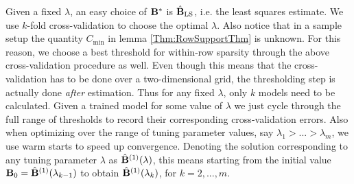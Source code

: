 Given a fixed $\lambda$, an easy choice of ${\mathbf{B}}^*$ is $\hat {{\mathbf{B}}}_\text{LS}$, i.e. the least squares estimate. We use $k$-fold cross-validation to choose the optimal $\lambda$. Also notice that in a sample setup the quantity $C_\text{min}$ in lemma \ref{Thm:RowSupportThm} is unknown. For this reason, we choose a best threshold for within-row sparsity through the above cross-validation procedure as well. Even though this means that the cross-validation has to be done over a two-dimensional grid, the thresholding step is actually done \textit{after} estimation. Thus for any fixed $\lambda$, only $k$ models need to be calculated. Given a trained model for some value of $\lambda$ we just cycle through the full range of thresholds to record their corresponding cross-validation errors. Also when optimizing over the range of tuning parameter values, say $\lambda_1 > ... > \lambda_m$, we use warm starts to speed up convergence. Denoting the solution corresponding to any tuning parameter $\lambda$ as $\hat {{\mathbf{B}}}^{(1)} (\lambda)$, this means starting from the initial value ${\mathbf{B}}_0 = \hat{{\mathbf{B}}}^{(1)} (\lambda_{k-1})$ to obtain $\hat{{\mathbf{B}}}^{(1)} (\lambda_k)$, for $k = 2,...,m$.

